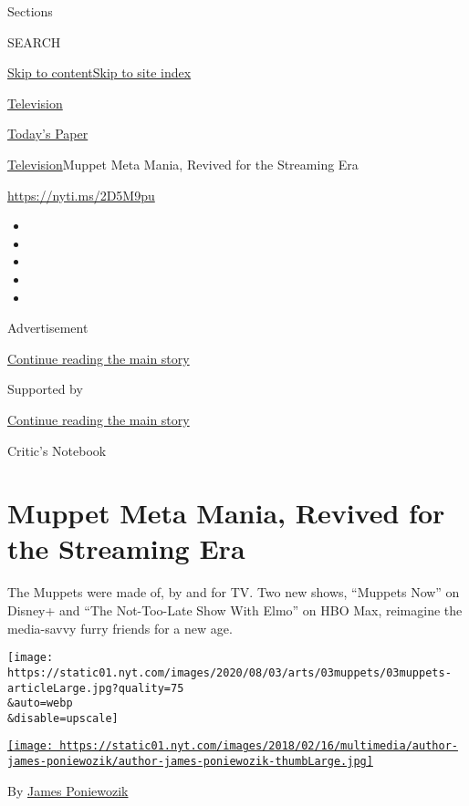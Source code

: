 Sections

SEARCH

\protect\hyperlink{site-content}{Skip to
content}\protect\hyperlink{site-index}{Skip to site index}

\href{https://www.nytimes.com/section/arts/television}{Television}

\href{https://myaccount.nytimes.com/auth/login?response_type=cookie\&client_id=vi}{}

\href{https://www.nytimes.com/section/todayspaper}{Today's Paper}

\href{/section/arts/television}{Television}\textbar{}Muppet Meta Mania,
Revived for the Streaming Era

\url{https://nyti.ms/2D5M9pu}

\begin{itemize}
\item
\item
\item
\item
\item
\end{itemize}

Advertisement

\protect\hyperlink{after-top}{Continue reading the main story}

Supported by

\protect\hyperlink{after-sponsor}{Continue reading the main story}

Critic's Notebook

\hypertarget{muppet-meta-mania-revived-for-the-streaming-era}{%
\section{Muppet Meta Mania, Revived for the Streaming
Era}\label{muppet-meta-mania-revived-for-the-streaming-era}}

The Muppets were made of, by and for TV. Two new shows, ``Muppets Now''
on Disney+ and ``The Not-Too-Late Show With Elmo'' on HBO Max, reimagine
the media-savvy furry friends for a new age.

\texttt{[image: https://static01.nyt.com/images/2020/08/03/arts/03muppets/03muppets-articleLarge.jpg?quality=75\\\&auto=webp\\\&disable=upscale]}

\href{https://www.nytimes.com/by/james-poniewozik}{\texttt{[image: https://static01.nyt.com/images/2018/02/16/multimedia/author-james-poniewozik/author-james-poniewozik-thumbLarge.jpg]}}

By \href{https://www.nytimes.com/by/james-poniewozik}{James Poniewozik}

